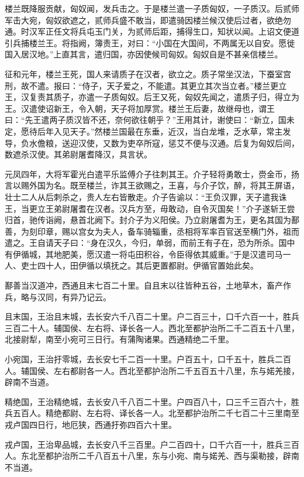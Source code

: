 \documentclass[]{article}
\begin{document}
楼兰既降服贡献，匈奴闻，发兵击之。于是楼兰遣一子质匈奴，一子质汉。后贰师军击大宛，匈奴欲遮之，贰师兵盛不敢当，即遣骑因楼兰候汉使后过者，欲绝勿通。时汉军正任文将兵屯玉门关，为贰师后距，捕得生口，知状以闻。上诏文便道引兵捕楼兰王。将指阙，簿责王，对曰：``小国在大国间，不两属无以自安。愿徙国入居汉地。''上直其言，遣归国，亦因使候司匈奴。匈奴自是不甚亲信楼兰。

征和元年，楼兰王死，国人来请质子在汉者，欲立之。质子常坐汉法，下蚕室宫刑，故不遣。报曰：``侍子，天子爱之，不能遣。其更立其次当立者。''楼兰更立王，汉复责其质子，亦遣一子质匈奴。后王又死，匈奴先闻之，遣质子归，得立为王。汉遣使诏新王，令入朝，天子将加厚赏。楼兰王后妻，故继母也，谓王曰：``先王遣两子质汉皆不还，奈何欲往朝乎？''王用其计，谢使曰：``新立，国未定，愿待后年入见天子。''然楼兰国最在东垂，近汉，当白龙堆，乏水草，常主发导，负水儋粮，送迎汉使，又数为吏卒所寇，惩艾不便与汉通。后复为匈奴后间，数遮杀汉使。其弟尉屠耆降汉，具言状。

元凤四年，大将军霍光白遣平乐监傅介子往刺其王。介子轻将勇敢士，赍金币，扬言以赐外国为名。既至楼兰，诈其王欲赐之，王喜，与介子饮，醉，将其王屏语，壮士二人从后刺杀之，贵人左右皆散走。介子告谕以：``王负汉罪，天子遣我诛王，当更立王弟尉屠耆在汉者。汉兵方至，毋敢动，自令灭国矣！''介子遂斩王尝归首，驰传诣阙，悬首北阙下。封介子为义阳侯。乃立尉屠耆为王，更名其国为鄯善，为刻印章，赐以宫女为夫人，备车骑辎重，丞相将军率百官送至横门外，祖而遣之。王自请天子曰：``身在汉久，今归，单弱，而前王有子在，恐为所杀。国中有伊循城，其地肥美，愿汉遣一将屯田积谷，令臣得依其威重。''于是汉遣司马一人、吏士四十人，田伊循以填抚之。其后更置都尉。伊循官置始此矣。

鄯善当汉道冲，西通且末七百二十里。自且末以往皆种五谷，土地草木，畜产作兵，略与汉同，有异乃记云。

且末国，王治且末城，去长安六千八百二十里。户二百三十，口千六百一十，胜兵三百二十人。辅国侯、左右将、译长各一人。西北至都护治所二千二百五十八里，北接尉犁，南至小宛可三日行。有蒲陶诸果。西通精绝二千里。

小宛国，王治扜零城，去长安七千二百一十里。户百五十，口千五十，胜兵二百人。辅国侯、左右都尉各一人。西北至都护治所二千五百五十八里，东与婼羌接，辟南不当道。

精绝国，王治精绝城，去长安八千八百二十里。户四百八十，口三千三百六十，胜兵五百人。精绝都尉、左右将、译长各一人。北至都护治所二千七百二十三里南至戎卢国四日行，地厄狭，西通扜弥四百六十里。

戎卢国，王治卑品城，去长安八千三百里。户二百四十，口千六百一十，胜兵三百人。东北至都护治所二千八百五十八里，东与小宛、南与婼羌、西与渠勒接，辟南不当道。
\end{document}
